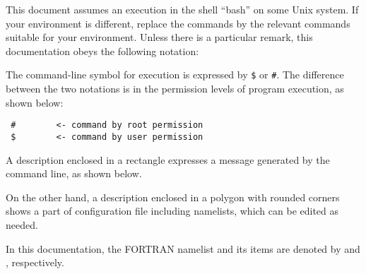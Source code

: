 
This document assumes an execution in the shell ``bash'' on some Unix system.
If your environment is different, replace the commands
by the relevant commands suitable for your environment.
Unless there is a particular remark, this documentation obeys the following notation:

The command-line symbol for execution is expressed by \verb|$| or \verb|#|.
The difference between the two notations is
in the permission levels of program execution, as shown below:
\begin{verbatim}
 #        <- command by root permission
 $        <- command by user permission
\end{verbatim}

A description enclosed in a rectangle expresses a message generated by the command line, as shown below.

On the other hand, a description enclosed in a polygon with rounded corners shows a part of configuration file including namelists, which can be edited as needed.

In this documentation, the FORTRAN namelist and its items are denoted by
 and , respectively.

